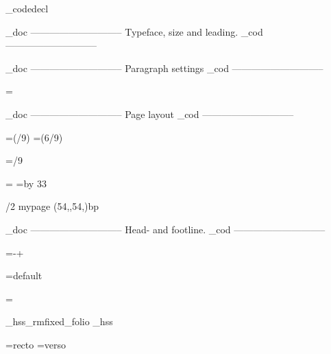 \_codedecl 

    \_doc -----------------------------
    Typeface, size and leading.
    \_cod -----------------------------

\fontfam[ebgaramond]
\typosize[11/14]

\def\ChapRed{\setcmykcolor{0 1 1 0.10}}

    \_doc -----------------------------
    Paragraph settings
    \_cod -----------------------------

\parskip=0pt
\parindent=\baselineskip

\relax
{}\relax


    \_doc -----------------------------
    Page layout
    \_cod -----------------------------



\newdimen\pagewidth     \pagewidth=6in
\newdimen\spinemargin   \spinemargin=\dimexpr(\pagewidth/9)\relax
\newdimen\measure       \measure=\dimexpr(6\pagewidth/9)

\newdimen\pageheight    \pageheight=9in 
\newdimen\depth         \depth=6in     
\newdimen\topmargin     \topmargin=/9\relax
                        \baselineskip
                        \baselineskip

%

\hsize=\measure
\vsize=\topskip \advance\vsize by 33\baselineskip %

\margins/2 mypage (54,,54,)bp

    \_doc -----------------------------
    Head- and footline.
    \_cod -----------------------------

\headlinedist=\dimexpr\baselineskip-\topskip+\baselineskip\relax

\newif\ifheadline \headlinetrue

\headline={default}

\newif\iffootline \footlinetrue

\footline={%
    \iffootline
        \ifodd\pageno
            \_hss\_rmfixed\currvar \_folio \_hss%
        \else
            \_hss\_rmfixed\setff{+onum,+pnum}\currvar \_folio \_hss%
        \fi
    \else
        \global\footlinetrue
    \fi
}

\newtoks\rectoheadtext  \rectoheadtext={recto}
\newtoks\versoheadtext  \versoheadtext={verso}

